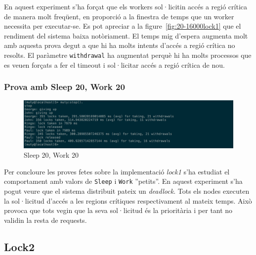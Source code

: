 \documentclass[a4paper, 11pt]{article}
\begin{document}
En aquest experiment s'ha forçat que els workers sol·licitin accés a regió
crítica de manera molt freqüent, en proporció a la finestra de temps que un
worker necessita per executar-se.  
Es pot apreciar a la figure~\ref{fig:20-16000lock1} que el rendiment del sistema
baixa notòriament. El temps mig d'espera augmenta molt amb aquesta prova degut a
que hi ha molts intents d'accés a regió crítica no resolts. El paràmetre
\texttt{withdrawal} ha augmentat perquè hi ha molts processos que es veuen
forçats a fer el timeout i sol·licitar accés a regió crítica de nou.

\subsubsection{Prova amb Sleep 20, Work 20}

\begin{figure}[H]
	\centering
    \includegraphics[width=1.0\textwidth]{figures/20-20lock1}
    \caption{Sleep 20, Work 20 \label{fig:20-20lock1}}    
\end{figure}

Per concloure les proves fetes sobre la implementació \textit{lock1} s'ha
estudiat el comportament amb valors de \texttt{Sleep} i \texttt{Work}
''petits''. En aquest experiment s'ha pogut veure que el sistema distribuit
pateix un \emph{deadlock}. Tots els nodes executen la sol·licitud d'accés a les regions
crítiques respectivament al mateix temps. Això provoca que tots vegin que la
seva sol·licitud és la prioritària i per tant no validin la resta de requests.

\subsection{Lock2}
\end{document}
